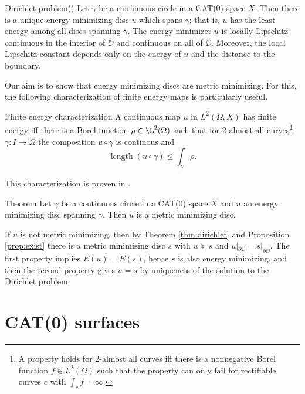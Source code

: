 \documentclass[a4paper,10pt]{amsart}
\begin{document}
\begin{thm}{Dirichlet problem}(\cite{KS})\label{thm:dirichlet}
Let $\gamma$ be a continuous circle in a CAT(0) space $X$. Then there is a unique energy minimizing disc $u$ which spans $\gamma$; that is, $u$
has the least energy among all discs spanning $\gamma$. The energy minimizer $u$ is locally Lipschitz continuous in the interior of $\DD$ and continuous on all of $\DD$.
Moreover, the local Lipschitz constant depends only on the energy of $u$ and the distance to the boundary.
\end{thm}



Our aim is to show that energy minimizing discs are metric minimizing. For this, the following characterization of finite energy maps is particularly useful.
\begin{thm}{Finite energy characterization}
A continuous map $u$ in $L^2(\Omega,X)$ has finite energy iff there is a Borel function $\rho\in\L^2(\Omega)$ such that for 2-almost all curves\footnote{A property holds for 
2-almost all curves iff there is a nonnegative Borel function $f\in L^2(\Omega)$ such that the property can only fail for rectifiable curves $c$ with $\int_c f=\infty$.} 
$\gamma:I\to\Omega$ the composition $u\circ\gamma$ is continous and
$$
\operatorname{length}(u\circ\gamma)\leq\int_\gamma \rho.
$$
\end{thm}

This characterization is proven in \cite{HKST}.

\begin{thm}{Theorem}
 Let $\gamma$ be a continuous circle in a CAT(0) space $X$ and $u$ an energy minimizing disc spanning $\gamma$.
 Then $u$ is a metric minimizing disc.
 \end{thm}

 If $u$ is not metric minimizing, then by Theorem \ref{thm:dirichlet} and Proposition \ref{prop:exist} there is a metric minimizing
 disc $s$ with $u \succcurlyeq s$ and $u|_{\partial\DD}=s|_{\partial\DD}$. The first property implies $E(u)=E(s)$, hence $s$ is also energy minimizing, and then the second
 property gives $u=s$ by uniqueness of the solution to the Dirichlet problem.
 \qeds
 





\section{CAT(0) surfaces}
\end{document}
